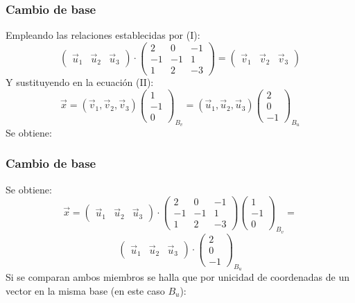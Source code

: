 \documentclass{beamer}
\begin{document}
 \begin{frame}
  \frametitle{Cambio de base}
Empleando las relaciones establecidas por (I): 
\[ \left(\begin{array}{ccc}\vec u_1 & \vec u_2 & \vec u_3\end{array}\right)\cdot \left(\begin{array}{ccc}2 & 0 & -1 \\-1 & -1 & 1 \\1 & 2 & -3\end{array}\right) = \left(\begin{array}{ccc}\vec v_1 & \vec v_2 & \vec v_3\end{array}\right)\]
Y sustituyendo en la ecuaci\'on (II):
\[\vec x =  (\vec v_1,\vec v_2, \vec v_3) \left(\begin{array}{c}1\\-1\\0\end{array}\right)_{B_v} = (\vec u_1,\vec u_2, \vec u_3) \left(\begin{array}{c}2\\0\\-1\end{array}\right)_{B_u}\]
Se obtiene:
\end{frame}

 \begin{frame}
  \frametitle{Cambio de base}
Se obtiene: 
\[\vec x =  \left(\begin{array}{ccc}\vec u_1 & \vec u_2 & \vec u_3\end{array}\right)\cdot \left(\begin{array}{ccc}2 & 0 & -1 \\-1 & -1 & 1 \\1 & 2 & -3\end{array}\right) \left(\begin{array}{c}1\\-1\\0\end{array}\right)_{B_v}  =\]
\[ \left(\begin{array}{ccc}\vec u_1 & \vec u_2 & \vec u_3\end{array}\right)\cdot  \left(\begin{array}{c}2\\0\\-1\end{array}\right)_{B_u} \]
Si se comparan ambos miembros se halla que por unicidad de coordenadas de un vector en la misma base (en este caso $B_u$):
\end{frame}
\end{document}
